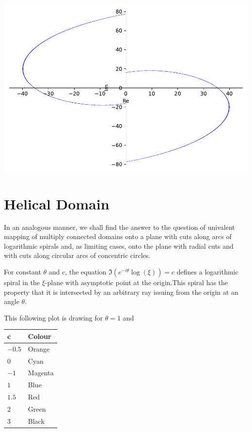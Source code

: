 \documentclass[
]{book}
\theoremstyle{definition}
\theoremstyle{definition}
\theoremstyle{definition}
\theoremstyle{definition}
\theoremstyle{remark}
\begin{document}
\includegraphics{ConformalMapping_files/figure-latex/unnamed-chunk-62-11.pdf}

\chapter{Helical Domain}\label{helical-domain-1}

In an analogous manner, we shall find the answer to the question of univalent mapping of multiply connected domains onto a plane with cuts along arcs of logarithmic spirals and, as limiting cases, onto the plane with radial cuts and with cuts along circular arcs of concentric circles.

For constant \(\theta\) and \(c\), the equation \(\Im(e^{-i\theta}\log(\xi))=c\) defines a logarithmic spiral in the \(\xi\)-plane with asymptotic point at the origin.This spiral has the property that it is intersected by an arbitrary ray issuing from the origin at an angle \(\theta\).

This following plot is drawing for \(\theta=1\) and

\begin{longtable}[]{@{}ll@{}}
\toprule\noalign{}
c & Colour \\
\midrule\noalign{}
\endhead
\bottomrule\noalign{}
\endlastfoot
\(-0.5\) & Orange \\
\(0\) & Cyan \\
\(-1\) & Magenta \\
\(1\) & Blue \\
\(1.5\) & Red \\
\(2\) & Green \\
\(3\) & Black \\
\end{longtable}
\end{document}
